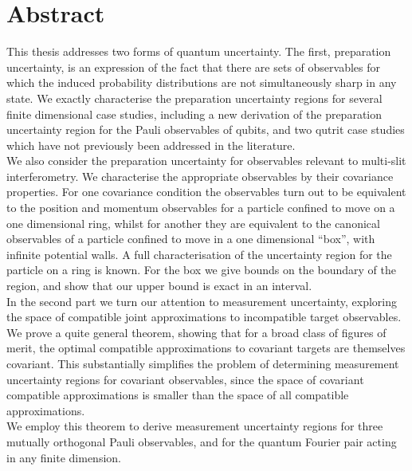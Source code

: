 



\chapter*{Abstract}
This thesis addresses two forms of quantum uncertainty. The first, preparation uncertainty, is an expression of the fact that there are sets of observables for which the induced probability distributions are not simultaneously sharp in any state. We exactly characterise the preparation uncertainty regions for several finite dimensional case studies, including a new derivation of the preparation uncertainty region for the Pauli observables of qubits, and two qutrit case studies which have not previously been addressed in the literature.\\
We also consider the preparation uncertainty for observables relevant to multi-slit interferometry. We characterise the appropriate observables by their covariance properties. For one covariance condition the observables turn out to be equivalent to the position and momentum observables for a particle confined to move on a one dimensional ring, whilst for another they are equivalent to the canonical observables of a particle confined to move in a one dimensional ``box'', with infinite potential walls. A full characterisation of the uncertainty region for the particle on a ring is known. For the box we give bounds on the boundary of the region, and show that our upper bound is exact in an interval.\\
In the second part we turn our attention to measurement uncertainty, exploring the space of compatible joint approximations to incompatible target observables. We prove a quite general theorem, showing that for a broad class of figures of merit, the optimal compatible approximations to covariant targets are themselves covariant. This substantially simplifies the problem of determining measurement uncertainty regions for covariant observables, since the space of covariant compatible approximations is smaller than the space of all compatible approximations.\\
We employ this theorem to derive measurement uncertainty regions for three mutually orthogonal Pauli observables, and for the quantum Fourier pair acting in any finite dimension.
\clearpage
